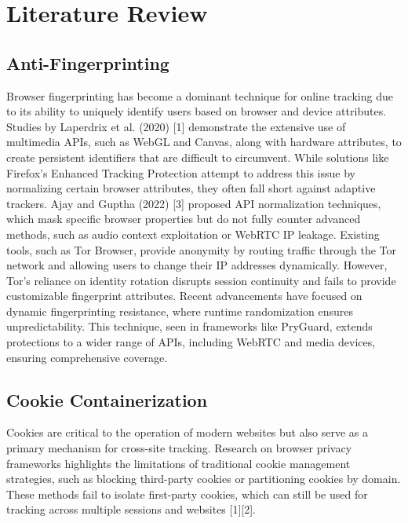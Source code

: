 \documentclass[conference]{IEEEtran}
\begin{document}
\section{Literature Review}


\subsection{Anti-Fingerprinting}
Browser fingerprinting has become a dominant technique for online tracking due to its ability to uniquely identify users based on browser and device attributes. Studies by Laperdrix et al. (2020) [1] demonstrate the extensive use of multimedia APIs, such as WebGL and Canvas, along with hardware attributes, to create persistent identifiers that are difficult to circumvent. While solutions like Firefox’s Enhanced Tracking Protection attempt to address this issue by normalizing certain browser attributes, they often fall short against adaptive trackers. Ajay and Guptha (2022) [3] proposed API normalization techniques, which mask specific browser properties but do not fully counter advanced methods, such as audio context exploitation or WebRTC IP leakage.
Existing tools, such as Tor Browser, provide anonymity by routing traffic through the Tor network and allowing users to change their IP addresses dynamically. However, Tor’s reliance on identity rotation disrupts session continuity and fails to provide customizable fingerprint attributes. Recent advancements have focused on dynamic fingerprinting resistance, where runtime randomization ensures unpredictability. This technique, seen in frameworks like PryGuard, extends protections to a wider range of APIs, including WebRTC and media devices, ensuring comprehensive coverage.

\subsection{Cookie Containerization}
Cookies are critical to the operation of modern websites but also serve as a primary mechanism for cross-site tracking. Research on browser privacy frameworks highlights the limitations of traditional cookie management strategies, such as blocking third-party cookies or partitioning cookies by domain. These methods fail to isolate first-party cookies, which can still be used for tracking across multiple sessions and websites [1][2].
\end{document}
